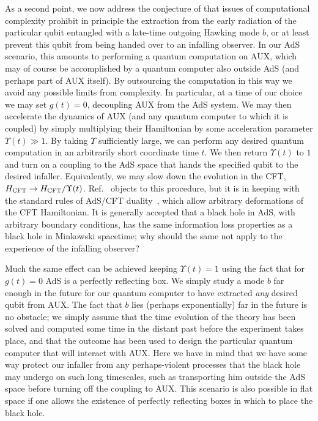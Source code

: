 \documentclass[12pt]{article}
\begin{document}
{{As a second point, we now} address the conjecture of \cite{Harlow:2013tf} that issues of computational complexity prohibit in principle the extraction from the early radiation of the particular qubit entangled with a late-time outgoing Hawking mode $b$, or at least prevent this qubit from being handed over to an infalling observer.  In our AdS scenario, this amounts to performing a quantum computation on AUX, which may of course be accomplished by a quantum computer also outside AdS (and perhaps part of AUX itself). By outsourcing the computation in this way we avoid any possible limits from complexity.  In particular, at a time of our choice we may set $g(t)=0$, decoupling AUX from the AdS system.  We may then accelerate the dynamics of AUX (and any quantum computer to which it is coupled) by simply multiplying their Hamiltonian by some acceleration parameter $\Upsilon (t) \gg 1$.  By taking $\Upsilon$ sufficiently large, we can perform any desired quantum computation in an arbitrarily short coordinate time $t$.  We then return $\Upsilon (t)$ to $1$ and turn on a coupling to the AdS space that hands the specified qubit to the desired infaller.  Equivalently, we may slow down the evolution in the CFT, $H_{\rm CFT} \to H_{\rm CFT} / \Upsilon (t)$.  Ref.~\cite{Harlow:2013tf} objects to this procedure, but it is in keeping with the standard rules of AdS/CFT duality~\cite{GKP,W}, which allow arbitrary deformations of the CFT Hamiltonian.  It is generally accepted that a black hole in AdS, with arbitrary boundary conditions, has the same information loss properties as a black hole in Minkowski spacetime; why should the same not apply to the experience of the infalling observer?

Much the same effect can be achieved keeping $\Upsilon(t) =1$ using the fact that for $g(t)=0$ AdS is a perfectly reflecting box.  We simply study a mode $b$ far enough in the future for our quantum computer to have extracted {\it any} desired qubit from AUX.  The fact that $b$ lies (perhaps exponentially) far in the future is no obstacle; we simply assume that the time evolution of the theory has been solved and computed some time in the distant past before the experiment takes place, and that the outcome has been used to design the particular quantum computer that will interact with AUX.   {Here we have in mind that we have some way protect our infaller from any perhaps-violent processes that the black hole may undergo on such long timescales, such as transporting him outside the AdS space before turning off the coupling to AUX.} This scenario is also possible in flat space if one allows the existence of perfectly reflecting boxes in which to place the black hole.




}
\end{document}

